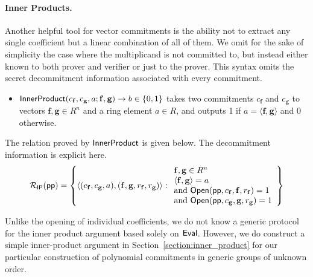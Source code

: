 \documentclass{article}
\theoremstyle{definition}
\begin{document}
\fi 

\paragraph{Inner Products.} Another helpful tool for vector commitments is the ability not to extract any single coefficient but a linear combination of all of them. We omit for the sake of simplicity the case where the multiplicand is not committed to, but instead either known to both prover and verifier or just to the prover. This syntax omits the secret decommitment information associated with every commitment.
\begin{itemize}
    \item $\textsf{{InnerProduct}}(c_\mathbf{f}, c_\mathbf{g}, a; \mathbf{f}, \mathbf{g}) \rightarrow b \in \{0,1\}$ takes two commitments $c_\mathbf{f}$ and $c_\mathbf{g}$ to vectors $\mathbf{f}, \mathbf{g} \in R^n$ and a ring element $a \in R$, and outputs 1 if $a = \langle \mathbf{f}, \mathbf{g} \rangle$ and 0 otherwise.
\end{itemize}
The relation proved by $\textsf{{InnerProduct}}$ is given below. The decommitment information is explicit here.
\[ 
\mathcal{R_\textsf{IP}}(\textsf{pp}) = \left\{
\langle (c_\mathbf{f}, c_\mathbf{g}, a), (\mathbf{f}, \mathbf{g}, r_\mathbf{f}, r_\mathbf{g}) \rangle
: 
\begin{array}{l} 
\mathbf{f}, \mathbf{g} \in R^n \ \\
\langle \mathbf{f}, \mathbf{g} \rangle = a \\ 
 \text{and} \ \textsf{{Open}}(\textsf{pp}, c_\mathbf{f}, \mathbf{f}, r_\mathbf{f}) = 1 \\
 \text{and} \ \textsf{{Open}}(\textsf{pp}, c_\mathbf{g}, \mathbf{g}, r_\mathbf{g}) = 1 
\end{array}
\right\}
\]

Unlike the opening of individual coefficients, we do not know a generic protocol for the inner product argument based solely on $\textsf{{Eval}}$. However, we do construct a simple inner-product argument in Section~\ref{section:inner_product} for our particular construction of polynomial commitments in generic groups of unknown order.
\end{document}
